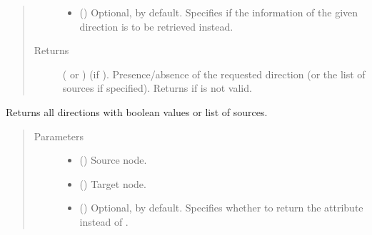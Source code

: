 \documentclass[letterpaper,10pt,english]{sphinxmanual}
\begin{document}
\begin{fulllineitems}
\begin{fulllineitems}
\begin{quote}
\begin{description}
\begin{itemize}
\item {} 
 () \textendash{} Optional,  by default. Specifies if the
 information of the given direction is to
be retrieved instead.

\end{itemize}

\item[{Returns}] \leavevmode
( or ) \textendash{} (if ). Presence/absence
of the requested direction (or the list of sources if
specified). Returns  if  is not valid.

\end{description}\end{quote}

\end{fulllineitems}


\begin{fulllineitems}
\label{\detokenize{main:pypath.main.Direction.get_dirs}}
Returns all directions with boolean values or list of sources.
\begin{quote}\begin{description}
\item[{Parameters}] \leavevmode\begin{itemize}
\item {} 
 () \textendash{} Source node.

\item {} 
 () \textendash{} Target node.

\item {} 
 () \textendash{} Optional,  by default. Specifies whether to return
the  attribute instead of .

\end{itemize}


\end{description}
\end{quote}
\end{fulllineitems}
\end{fulllineitems}
\end{document}

